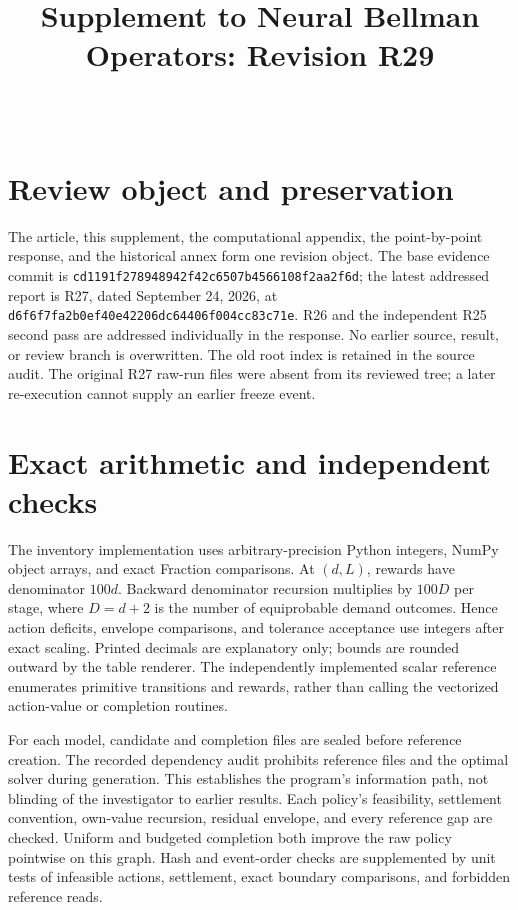 

\begin{frontmatter}
\title{Supplement to Neural Bellman Operators: Revision R29}
\begin{aug}\author[id=au1,addressref={add1}]{~}\address[id=add1]{}\end{aug}
\end{frontmatter}

\section{Review object and preservation}
The article, this supplement, the computational appendix, the point-by-point response, and the historical annex form one revision object. The base evidence commit is \texttt{cd1191f278948942f42c6507b4566108f2aa2f6d}; the latest addressed report is R27, dated September 24, 2026, at \texttt{d6f6f7fa2b0ef40e42206dc64406f004cc83c71e}. R26 and the independent R25 second pass are addressed individually in the response. No earlier source, result, or review branch is overwritten. The old root index is retained in the source audit. The original R27 raw-run files were absent from its reviewed tree; a later re-execution cannot supply an earlier freeze event.

\section{Exact arithmetic and independent checks}
The inventory implementation uses arbitrary-precision Python integers, NumPy object arrays, and exact Fraction comparisons. At $(d,L)$, rewards have denominator $100d$. Backward denominator recursion multiplies by $100D$ per stage, where $D=d+2$ is the number of equiprobable demand outcomes. Hence action deficits, envelope comparisons, and tolerance acceptance use integers after exact scaling. Printed decimals are explanatory only; bounds are rounded outward by the table renderer. The independently implemented scalar reference enumerates primitive transitions and rewards, rather than calling the vectorized action-value or completion routines.

For each model, candidate and completion files are sealed before reference creation. The recorded dependency audit prohibits reference files and the optimal solver during generation. This establishes the program's information path, not blinding of the investigator to earlier results. Each policy's feasibility, settlement convention, own-value recursion, residual envelope, and every reference gap are checked. Uniform and budgeted completion both improve the raw policy pointwise on this graph. Hash and event-order checks are supplemented by unit tests of infeasible actions, settlement, exact boundary comparisons, and forbidden reference reads.

